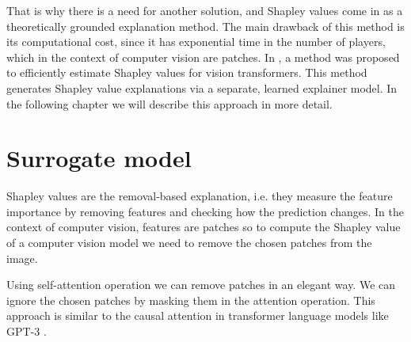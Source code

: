 \documentclass[magisterska,en]{pracamgr}
\begin{document}
That is why there is a need for another solution, and Shapley values come in as a theoretically grounded explanation method. The main drawback of this method is its computational cost, since it has exponential time in the number of players, which in the context of computer vision are patches. In \cite{DBLP:conf/iclr/Covert0L23}, a method was proposed to efficiently estimate Shapley values for vision transformers. This method generates Shapley value explanations via a separate, learned explainer model. In the following chapter we will describe this approach in more detail.



\section{Surrogate model}\label{s:surrogate}
Shapley values are the removal-based explanation, i.e. they measure the feature importance by removing features and checking how the prediction changes. In the context of computer vision, features are patches so to compute the Shapley value of a computer vision model we need to remove the chosen patches from the image. 

Using self-attention operation we can remove patches in an elegant way. We can ignore the chosen patches by masking them in the attention operation. This approach is similar to the causal attention in transformer language models like GPT-3 \cite{DBLP:conf/nips/BrownMRSKDNSSAA20}.
\end{document}
